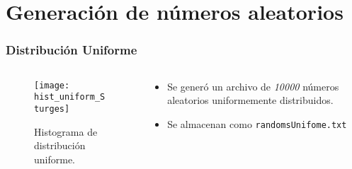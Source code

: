 
\section{Generación de números aleatorios} %


\begin{frame}
	\frametitle{Distribución Uniforme}
	
	    \begin{columns}
		
		\begin{column}{0.5\textwidth} %
			\begin{figure}
				\centering
				\texttt{[image: hist\_uniform\_Sturges]} %
				\caption{Histograma de distribución uniforme.}
			\end{figure}
		\end{column}
		
		\begin{column}{0.5\textwidth} %
			\begin{itemize}
				\item Se generó un archivo de \textit{10000} números aleatorios uniformemente distribuidos. 
				\item Se almacenan como \texttt{randomsUnifome.txt}
			\end{itemize}
		\end{column}
	\end{columns}
\end{frame}


